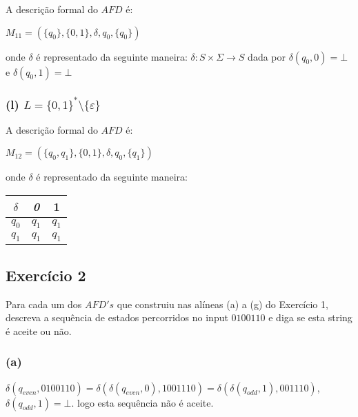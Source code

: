 \documentclass{article}
\begin{document}
A descrição formal do $AFD$ é:
\begin{center}
  $M_{11} = (\{q_{0}\}, \{0,1\},\delta, q_{0}, \{q_0\})$
\end{center}
onde $\delta$ é representado da seguinte maneira: $\delta:S\times \Sigma\to S$ dada por $\delta(q_0,0)=\bot$ e $\delta(q_0,1)=\bot$

\subsubsection*{(l) $L = \{0, 1\}^{*} \setminus \{\varepsilon\}$}

\begin{center}
\end{center}

A descrição formal do $AFD$ é:
\begin{center}
  $M_{12} = (\{q_{0},q_1\}, \{0,1\},\delta, q_{0}, \{q_1\})$
\end{center}

onde $\delta$ é representado da seguinte maneira:
\begin{table}[htbp]
  \centering
  \begin{tabular}{c|cc}
    \textit{$\delta$} & \textit{0} & 1       \\ \hline
    $q_{0}$           & $q_{1}$    & $q_{1}$ \\
    $q_{1}$           & $q_{1}$    & $q_{1}$
  \end{tabular}
\end{table}

\subsection*{Exercício 2}
Para cada um dos $AFD's$ que construiu nas alíneas (a) a (g) do Exercício 1, descreva a sequência de estados percorridos no input $0100110$ e diga se esta string é aceite ou não.

\subsubsection*{(a)}
$\delta(q_{even}, 0100110) = \delta(\delta(q_{even}, 0), 1001110) = \delta(\delta(q_{odd}, 1), 001110)$, $\delta(q_{odd}, 1) = \bot$. logo esta sequência não é aceite.
\end{document}
